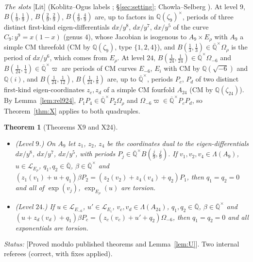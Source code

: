 \documentclass[11pt]{amsart}
\newtheorem{theorem}{Theorem}[section]
\theoremstyle{definition}
\newcommand{\Qb}{\overline{\mathbb{Q}}}
\newcommand{\Q}{\mathbb{Q}}
\newcommand{\Lg}{\mathcal{L}}
\newcommand{\vp}{\varpi}
\newcommand{\lab}[1]{\textup{[#1]}}
\newcommand{\LabC}{\lab{Proved modulo published theorems and Lemma~\ref{lem:U}}}
\newcommand{\Status}{\noindent\emph{Status:} }
\begin{document}
\noindent\emph{The slots} \lab{Lit} (Koblitz--Ogus labels \cite{KO79}; \S\ref{sec:setting}; Chowla--Selberg \cite{Gr78}).
At level $9$, $B(\frac19,\frac19)$, $B(\frac29,\frac29)$, $B(\frac49,\frac49)$ are, up to factors in $\Q(\zeta_9)^\times$,
periods of three distinct first-kind eigen-differentials $dx/y^8$, $dx/y^7$, $dx/y^5$ of the curve $C_9\colon y^9=x(1-x)$
(genus $4$), whose Jacobian is isogenous to $A_9\times E_\rho$ with $A_9$ a simple CM threefold (CM by $\Q(\zeta_9)$, type
$\{1,2,4\}$), and $B(\frac13,\frac13)\in\Qb^\times\Omega_\rho$ is the period of $dx/y^6$, which comes from $E_\rho$. At level
$24$, $B(\frac1{24},\frac1{24})\in\Qb^\times\Omega_{-6}$ and $B(\frac1{24},\frac14)\in\Qb^\times\vp$ are periods of CM curves
$E_{-6}$, $E_i$ with CM by $\Q(\sqrt{-6})$ and $\Q(i)$, and $B(\frac1{24},\frac1{12})$, $B(\frac1{24},\frac18)$ are, up to
$\Qb^\times$, periods $P_c$, $P_d$ of two distinct first-kind eigen-coordinates $z_c,z_d$ of a simple CM fourfold $A_{24}$
(CM by $\Q(\zeta_{24})$). By Lemma~\ref{lem:rel924}, $P_1P_4\in\Qb^\times P_2\Omega_\rho$ and $\Omega_{-6}\vp\in\Qb^\times
P_cP_d$, so Theorem~\ref{thm:X} applies to both quadruples.

\begin{theorem}[Theorems X9 and X24]\label{thm:X924}
\begin{itemize}
\item[(1)] \textup{(Level $9$.)} On $A_9$ let $z_1$, $z_2$, $z_4$ be the coordinates dual to the eigen-differentials $dx/y^8$, $dx/y^7$,
$dx/y^5$, with periods $P_j\in\Qb^\times B(\frac j9,\frac j9)$. If $v_1,v_2,v_4\in\Lambda(A_9)$, $u\in\Lg_{E_\rho}$, $q_1,q_2\in\Qb$,
$\beta\in\Qb^\times$ and $(z_1(v_1)+u+q_1)\beta P_2=(z_2(v_2)+z_4(v_4)+q_2)P_1$, then $q_1=q_2=0$ and all of $\exp(v_j)$,
$\exp_{E_\rho}(u)$ are torsion.
\item[(2)] \textup{(Level $24$.)} If $u\in\Lg_{E_{-6}}$, $u'\in\Lg_{E_i}$, $v_c,v_d\in\Lambda(A_{24})$, $q_1,q_2\in\Qb$,
$\beta\in\Qb^\times$ and $(u+z_d(v_d)+q_1)\beta P_c=(z_c(v_c)+u'+q_2)\Omega_{-6}$, then $q_1=q_2=0$ and all exponentials are
torsion.
\end{itemize}
\end{theorem}

\Status \LabC. Two internal referees (correct, with fixes applied).
\end{document}
